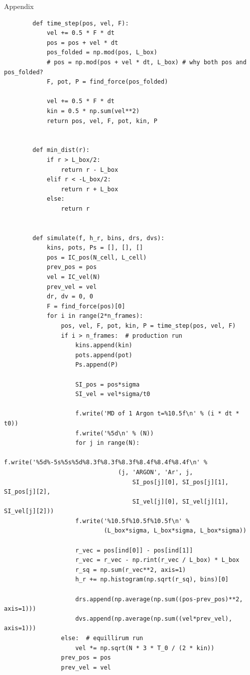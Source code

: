 \documentclass{article}
\begin{document}
\begin{section}{Appendix}
\begin{enumerate}
\begin{verbatim}
        def time_step(pos, vel, F):
            vel += 0.5 * F * dt
            pos = pos + vel * dt
            pos_folded = np.mod(pos, L_box)
            # pos = np.mod(pos + vel * dt, L_box) # why both pos and pos_folded?
            F, pot, P = find_force(pos_folded)

            vel += 0.5 * F * dt
            kin = 0.5 * np.sum(vel**2)
            return pos, vel, F, pot, kin, P


        def min_dist(r):
            if r > L_box/2:
                return r - L_box
            elif r < -L_box/2:
                return r + L_box
            else:
                return r


        def simulate(f, h_r, bins, drs, dvs):
            kins, pots, Ps = [], [], []
            pos = IC_pos(N_cell, L_cell)
            prev_pos = pos
            vel = IC_vel(N)
            prev_vel = vel
            dr, dv = 0, 0
            F = find_force(pos)[0]
            for i in range(2*n_frames):
                pos, vel, F, pot, kin, P = time_step(pos, vel, F)
                if i > n_frames:  # production run
                    kins.append(kin)
                    pots.append(pot)
                    Ps.append(P)

                    SI_pos = pos*sigma
                    SI_vel = vel*sigma/t0

                    f.write('MD of 1 Argon t=%10.5f\n' % (i * dt * t0))
                    f.write('%5d\n' % (N))
                    for j in range(N):
                        f.write('%5d%-5s%5s%5d%8.3f%8.3f%8.3f%8.4f%8.4f%8.4f\n' %
                                (j, 'ARGON', 'Ar', j,
                                    SI_pos[j][0], SI_pos[j][1], SI_pos[j][2],
                                    SI_vel[j][0], SI_vel[j][1], SI_vel[j][2]))
                    f.write('%10.5f%10.5f%10.5f\n' %
                            (L_box*sigma, L_box*sigma, L_box*sigma))

                    r_vec = pos[ind[0]] - pos[ind[1]]
                    r_vec = r_vec - np.rint(r_vec / L_box) * L_box
                    r_sq = np.sum(r_vec**2, axis=1)
                    h_r += np.histogram(np.sqrt(r_sq), bins)[0]

                    drs.append(np.average(np.sum((pos-prev_pos)**2, axis=1)))
                    dvs.append(np.average(np.sum((vel*prev_vel), axis=1)))
                else:  # equillirum run
                    vel *= np.sqrt(N * 3 * T_0 / (2 * kin))
                prev_pos = pos
                prev_vel = vel


\end{verbatim}
\end{enumerate}
\end{section}
\end{document}
